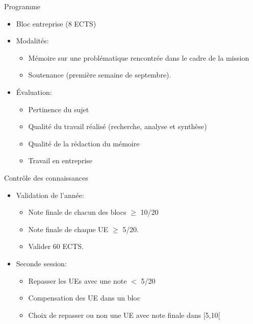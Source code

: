 \documentclass[minimal,compress]{beamer}
\begin{document}
\begin{frame}{Programme}

\begin{itemize}
\item \alert{Bloc entreprise} (8 ECTS)
\end{itemize}

\begin{itemize}
\item Modalités:
\begin{itemize}
\item Mémoire sur une problématique rencontrée dans le cadre de la mission
\item Soutenance (première semaine de septembre).
\end{itemize}
\item Évaluation:
\begin{itemize}
\item Pertinence du sujet
\item Qualité du travail réalisé (recherche, analyse et synthèse)
\item Qualité de la rédaction du mémoire
\item Travail en entreprise
\end{itemize}

\end{itemize}

\end{frame}


\begin{frame}{Contrôle des connaissances}
\begin{itemize}
\item Validation de l’année:
\begin{itemize}
\item Note finale de \alert{chacun des blocs} $\geq$ \alert{10}/20
\item Note finale de \alert{chaque UE} $\geq$ \alert{5}/20.
\item Valider 60 ECTS.
\end{itemize}
\item Seconde session:
\begin{itemize}
\item Repasser les UEs avec une note $<$ \alert{5/20}
\item Compensation des UE dans un bloc
\item Choix de repasser ou non une UE avec note finale dans [5,10[
\end{itemize}
\end{itemize}
\end{frame}
\end{document}
